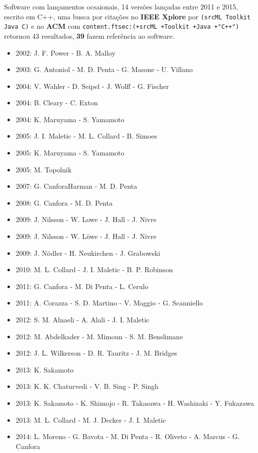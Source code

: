 Software com lançamentos ocsaionais,
14 versões lançadas
entre 2011 e 2015,
escrito em C++,
uma busca por citações no {\bf IEEE Xplore} por
\texttt{(srcML Toolkit Java C)}
e no {\bf ACM} com
\texttt{content.ftsec:(+srcML +Toolkit +Java +"C++")}
retornou
43 resultados,
{\bf 39} fazem referência ao software.

\begin{itemize}
\item 2002: J. F. Power - B. A. Malloy
\item 2003: G. Antoniol - M. D. Penta - G. Masone - U. Villano
\item 2004: V. Wahler - D. Seipel - J. Wolff - G. Fischer
\item 2004: B. Cleary - C. Exton
\item 2004: K. Maruyama - S. Yamamoto
\item 2005: J. I. Maletic - M. L. Collard - B. Simoes
\item 2005: K. Maruyama - S. Yamamoto
\item 2005: M. Topolnik
\item 2007: G. CanforaHarman - M. D. Penta
\item 2008: G. Canfora - M. D. Penta
\item 2009: J. Nilsson - W. Lowe - J. Hall - J. Nivre
\item 2009: J. Nilsson - W. L\"{o}we - J. Hall - J. Nivre
\item 2009: J. Nödler - H. Neukirchen - J. Grabowski
\item 2010: M. L. Collard - J. I. Maletic - B. P. Robinson
\item 2011: G. Canfora - M. Di Penta - L. Cerulo
\item 2011: A. Corazza - S. D. Martino - V. Maggio - G. Scanniello
\item 2012: S. M. Alnaeli - A. Alali - J. I. Maletic
\item 2012: M. Abdelkader - M. Mimoun - S. M. Benslimane
\item 2012: J. L. Wilkerson - D. R. Tauritz - J. M. Bridges
\item 2013: K. Sakamoto
\item 2013: K. K. Chaturvedi - V. B. Sing - P. Singh
\item 2013: K. Sakamoto - K. Shimojo - R. Takasawa - H. Washizaki - Y. Fukazawa
\item 2013: M. L. Collard - M. J. Decker - J. I. Maletic
\item 2014: L. Moreno - G. Bavota - M. Di Penta - R. Oliveto - A. Marcus - G. Canfora

\end{itemize}
